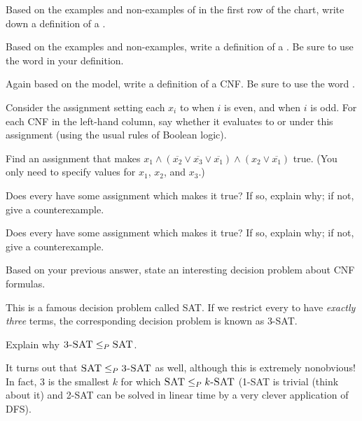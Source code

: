 \documentclass{tufte-handout}
\begin{document}
\begin{questions}
\item Based on the examples and non-examples of  in the first row
  of the chart, write down a definition of a .
\item Based on the examples and non-examples, write a definition of
  a . Be sure to use the word  in your definition.
\item Again based on the model, write a definition of a
  CNF. Be sure to use the word .
\item Consider the assignment setting each $x_i$ to \True when $i$ is
  even, and \False when $i$ is odd.  For each CNF in the left-hand
  column, say whether it evaluates to \True or \False under this
  assignment (using the usual rules of Boolean logic).
\item Find an assignment that makes $x_1 \land (\overline{x_2} \lor
  \overline{x_3} \lor \overline{x_1}) \land (x_2 \lor \overline{x_1})$
  true. (You only need to specify values for $x_1$, $x_2$, and $x_3$.)
\item Does every  have some assignment which makes it
  true?  If so, explain why; if not, give a counterexample.
\item Does every  have some assignment which makes it
  true?  If so, explain why; if not, give a counterexample.
\item Based on your previous answer, state an interesting decision
  problem about CNF formulas.
\end{questions}

This is a famous decision problem called \textsc{SAT}.  If we restrict
every  to have \emph{exactly three} terms, the
corresponding decision problem is known as \textsc{3-SAT}.

\begin{questions}
\item Explain why $\textsc{3-SAT} \leq_P \textsc{SAT}$.
\end{questions}

It turns out that $\textsc{SAT} \leq_P \textsc{3-SAT}$ as well, although
this is extremely nonobvious!  In fact, $3$ is the smallest $k$ for
which $\textsc{SAT} \leq_P k\textsc{-SAT}$ (\textsc{1-SAT} is trivial
(think about it) and \textsc{2-SAT} can be solved in linear time by a
very clever application of DFS).

\pause
\end{document}
